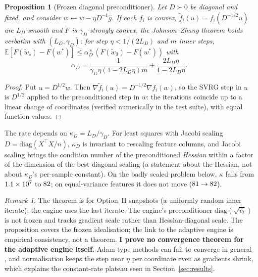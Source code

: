 \documentclass[11pt]{article}
\newtheorem{proposition}{Proposition}
\theoremstyle{remark}
\newtheorem*{remark}{Remark}
\newcommand{\E}{\mathbb{E}}
\newcommand{\ghat}{\hat g}
\begin{document}
\begin{proposition}[Frozen diagonal preconditioner]\label{prop:precond}
Let $D\succ0$ be diagonal and fixed, and consider $w\leftarrow w-\eta D^{-1}\ghat$. If each $f_i$ is convex, $\tilde f_i(u)=f_i(D^{-1/2}u)$ are $L_D$-smooth and $\tilde F$ is $\gamma_D$-strongly convex, the Johnson--Zhang theorem \cite{johnson2013} holds verbatim with $(L_D,\gamma_D)$: for step $\eta<1/(2L_D)$ and $m$ inner steps, $\E[F(\tilde w_s)-F(w^\ast)]\le\alpha_D^{\,s}\,(F(\tilde w_0)-F(w^\ast))$ with
\[
\alpha_D=\frac{1}{\gamma_D\eta(1-2L_D\eta)m}+\frac{2L_D\eta}{1-2L_D\eta}.
\]
\end{proposition}
\begin{proof}
Put $u=D^{1/2}w$. Then $\nabla\tilde f_i(u)=D^{-1/2}\nabla f_i(w)$, so the SVRG step in $u$ is $D^{1/2}$ applied to the preconditioned step in $w$: the iterations coincide up to a linear change of coordinates (verified numerically in the test suite), with equal function values.
\end{proof}
The rate depends on $\kappa_D=L_D/\gamma_D$. For least squares with Jacobi scaling $D=\mathrm{diag}(X^\top X/n)$, $\kappa_D$ is invariant to rescaling feature columns, and Jacobi scaling brings the condition number of the preconditioned \emph{Hessian} within a factor of the dimension of the best diagonal scaling \cite{vandersluis1969} (a statement about the Hessian, not about $\kappa_D$'s per-sample constant). On the badly scaled problem below, $\kappa$ falls from $1.1\times 10^{7}$ to $82$; on equal-variance features it does not move ($81\to82$).
\begin{remark}
The theorem is for Option~II snapshots (a uniformly random inner iterate); the engine uses the last iterate. The engine's preconditioner $\mathrm{diag}(\sqrt{\hat v_t})$ is not frozen and tracks gradient scale rather than Hessian-diagonal scale. The proposition covers the frozen idealisation; the link to the adaptive engine is empirical consistency, not a theorem. \textbf{I prove no convergence theorem for the adaptive engine itself.} Adam-type methods can fail to converge in general \cite{reddi2018}, and normalisation keeps the step near $\eta$ per coordinate even as gradients shrink, which explains the constant-rate plateau seen in Section~\ref{sec:results}.
\end{remark}
\end{document}
